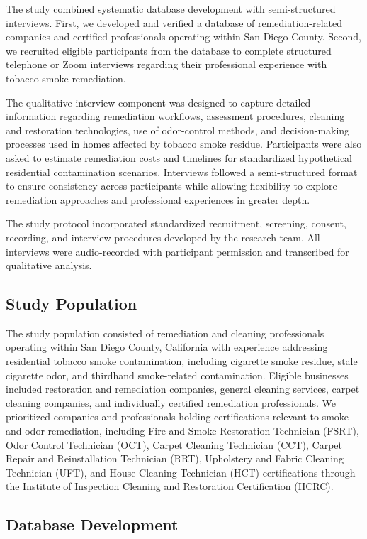 \documentclass[stu]{apa7}
\begin{document}
The study combined systematic database development with semi-structured interviews. First, we developed and verified a database of remediation-related companies and certified professionals operating within San Diego County. Second, we recruited eligible participants from the database to complete structured telephone or Zoom interviews regarding their professional experience with tobacco smoke remediation.

The qualitative interview component was designed to capture detailed information regarding remediation workflows, assessment procedures, cleaning and restoration technologies, use of odor-control methods, and decision-making processes used in homes affected by tobacco smoke residue. Participants were also asked to estimate remediation costs and timelines for standardized hypothetical residential contamination scenarios. Interviews followed a semi-structured format to ensure consistency across participants while allowing flexibility to explore remediation approaches and professional experiences in greater depth.

The study protocol incorporated standardized recruitment, screening, consent, recording, and interview procedures developed by the research team. All interviews were audio-recorded with participant permission and transcribed for qualitative analysis.

\subsection{Study Population}

The study population consisted of remediation and cleaning professionals operating within San Diego County, California with experience addressing residential tobacco smoke contamination, including cigarette smoke residue, stale cigarette odor, and thirdhand smoke-related contamination. Eligible businesses included restoration and remediation companies, general cleaning services, carpet cleaning companies, and individually certified remediation professionals. We prioritized companies and professionals holding certifications relevant to smoke and odor remediation, including Fire and Smoke Restoration Technician (FSRT), Odor Control Technician (OCT), Carpet Cleaning Technician (CCT), Carpet Repair and Reinstallation Technician (RRT), Upholstery and Fabric Cleaning Technician (UFT), and House Cleaning Technician (HCT) certifications through the Institute of Inspection Cleaning and Restoration Certification (IICRC).

\subsection{Database Development}
\end{document}
